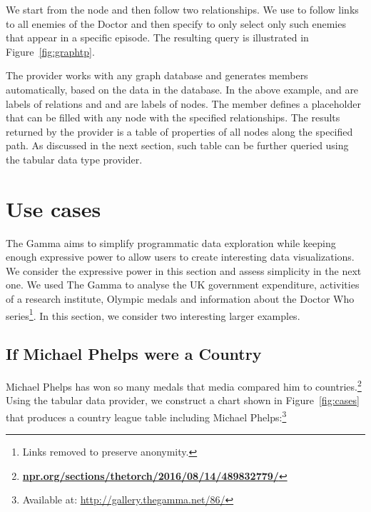 \documentclass[manuscript,review,anonymous]{acmart}
\begin{document}
We start from the  node and then follow two relationships. We use
to follow links to all enemies of the Doctor and then specify
to only select only such enemies that appear in a specific episode. The resulting query
is illustrated in Figure~\ref{fig:graphtp}.

The provider works with any graph database and generates members automatically, based on the
data in the database. In the above example,  and  are labels
of relations and  and  are labels of nodes. The
\ikvd{[any]} member defines a placeholder that can be filled with any node with the specified
relationships. The results returned by the provider is a table of properties of all nodes
along the specified path. As discussed in the next section, such table can be further queried
using the tabular data type provider.


\section{Use cases}
\label{sec:cases}

The Gamma aims to simplify programmatic data exploration while keeping enough expressive power
to allow users to create interesting data visualizations. We consider the expressive power in
this section and assess simplicity in the next one. We used The Gamma to analyse
the UK government expenditure, activities of a research institute, Olympic medals and
information about the Doctor Who series\footnote{Links removed to preserve anonymity.}.
In this section, we consider two interesting larger examples.

\subsection{If Michael Phelps were a Country}
Michael Phelps has won so many medals that media compared him to
countries.\footnote{\href{https://www.npr.org/sections/thetorch/2016/08/14/489832779/}{\small\bf\ttfamily npr.org/sections/thetorch/2016/08/14/489832779/}}
Using the tabular data provider, we construct a chart shown in Figure~\ref{fig:cases} that
produces a country league table including Michael Phelps:\footnote{Available at: \url{http://gallery.thegamma.net/86/}}
\end{document}
